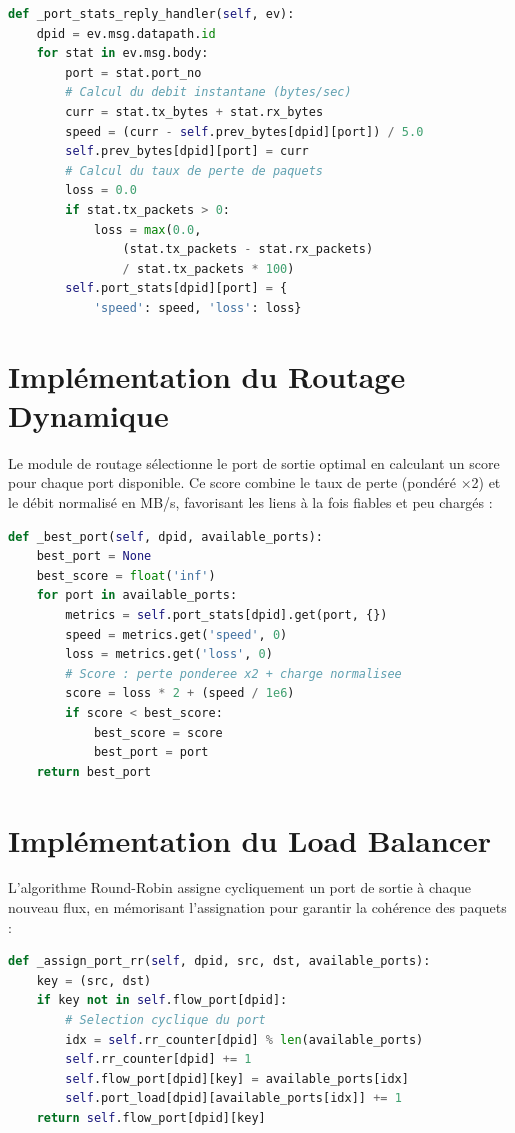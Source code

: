 \documentclass[12pt,a4paper]{report}
\begin{document}
\begin{lstlisting}[language=Python,
caption=Calcul du débit et taux de perte (traffic\_manager.py)]
def _port_stats_reply_handler(self, ev):
    dpid = ev.msg.datapath.id
    for stat in ev.msg.body:
        port = stat.port_no
        # Calcul du debit instantane (bytes/sec)
        curr = stat.tx_bytes + stat.rx_bytes
        speed = (curr - self.prev_bytes[dpid][port]) / 5.0
        self.prev_bytes[dpid][port] = curr
        # Calcul du taux de perte de paquets
        loss = 0.0
        if stat.tx_packets > 0:
            loss = max(0.0,
                (stat.tx_packets - stat.rx_packets)
                / stat.tx_packets * 100)
        self.port_stats[dpid][port] = {
            'speed': speed, 'loss': loss}
\end{lstlisting}

\section{Implémentation du Routage Dynamique}
Le module de routage sélectionne le port de sortie
optimal en calculant un score pour chaque port disponible.
Ce score combine le taux de perte (pondéré ×2) et le
débit normalisé en MB/s, favorisant les liens à la fois
fiables et peu chargés :

\begin{lstlisting}[language=Python,
caption=Sélection du meilleur port (routing.py)]
def _best_port(self, dpid, available_ports):
    best_port = None
    best_score = float('inf')
    for port in available_ports:
        metrics = self.port_stats[dpid].get(port, {})
        speed = metrics.get('speed', 0)
        loss = metrics.get('loss', 0)
        # Score : perte ponderee x2 + charge normalisee
        score = loss * 2 + (speed / 1e6)
        if score < best_score:
            best_score = score
            best_port = port
    return best_port
\end{lstlisting}

\section{Implémentation du Load Balancer}
L'algorithme Round-Robin assigne cycliquement un port
de sortie à chaque nouveau flux, en mémorisant
l'assignation pour garantir la cohérence des paquets :

\begin{lstlisting}[language=Python,
caption=Algorithme Round-Robin (load\_balancer.py)]
def _assign_port_rr(self, dpid, src, dst, available_ports):
    key = (src, dst)
    if key not in self.flow_port[dpid]:
        # Selection cyclique du port
        idx = self.rr_counter[dpid] % len(available_ports)
        self.rr_counter[dpid] += 1
        self.flow_port[dpid][key] = available_ports[idx]
        self.port_load[dpid][available_ports[idx]] += 1
    return self.flow_port[dpid][key]
\end{lstlisting}
\end{document}
